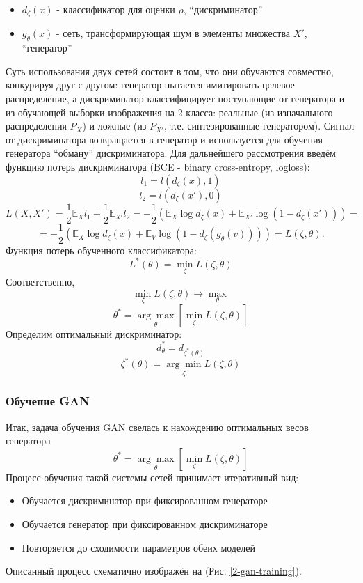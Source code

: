 			\begin{itemize}
				\item $d_{\zeta}(x)$ - классификатор для оценки $\rho$, ``дискриминатор''
				\item $g_{\theta}(x)$ - сеть, трансформирующая шум в элементы множества $X'$, ``генератор''
			\end{itemize}
	
			Суть использования двух сетей состоит в том, что они обучаются совместно, конкурируя друг с другом: генератор пытается имитировать целевое распределение, а дискриминатор классифицирует поступающие от генератора и из обучающей выборки изображения на 2 класса: реальные (из изначального распределения $P_X$) и ложные (из $P_{X'}$, т.е. синтезированные генератором). Сигнал от дискриминатора возвращается в генератор и используется для обучения генератора ``обману'' дискриминатора.
			Для дальнейшего рассмотрения введём функцию потерь дискриминатора (BCE - binary cross-entropy, logloss):
			$$ l_1 = l(d_{\zeta}(x), 1) $$
			$$ l_2 = l(d_{\zeta}(x'), 0) $$
			$$ L(X, X') = \frac{1}{2} \mathbb{E}_{X} l_1 + \frac{1}{2} \mathbb{E}_{X'} l_2 = -\frac{1}{2} (\mathbb{E}_{X} \log d_{\zeta}(x) + \mathbb{E}_{X'} \log (1 - d_{\zeta}(x'))) = $$
			$$ =  -\frac{1}{2} (\mathbb{E}_{X} \log d_{\zeta}(x) + \mathbb{E}_{V} \log (1 - d_{\zeta}(g_{\theta}(v)))) = L(\zeta, \theta) .$$
			Функция потерь обученного классификатора:
			$$ L^*(\theta) = \underset{\zeta}{\min} L(\zeta, \theta) $$
			Соответственно,
			$$ \underset{\zeta}{\min} L(\zeta, \theta) \longrightarrow \underset{\theta}{\max} $$
			$$ \theta^* = \underset{\theta}{\arg\max} \left[ \underset{\zeta}{\min} L(\zeta, \theta) \right] $$
			Определим оптимальный дискриминатор:
			$$ d^*_{\theta} = d_{\zeta^*(\theta)} $$
			$$ \zeta^*(\theta) =  \underset{\zeta}{\arg\min} L(\zeta, \theta)$$
			
		\subsubsection{Обучение GAN}
			Итак, задача обучения GAN свелась к нахождению оптимальных весов генератора
			$$ \theta^* = \underset{\theta}{\arg\max} \left[ \underset{\zeta}{\min} L(\zeta, \theta) \right] $$
			Процесс обучения такой системы сетей принимает итеративный вид:
	
			\begin{itemize}
				\item Обучается дискриминатор при фиксированном генераторе
				\item Обучается генератор при фиксированном дискриминаторе
				\item Повторяется до сходимости параметров обеих моделей
			\end{itemize}
			Описанный процесс схематично изображён на (Рис. \ref{2-gan-training}).
	
